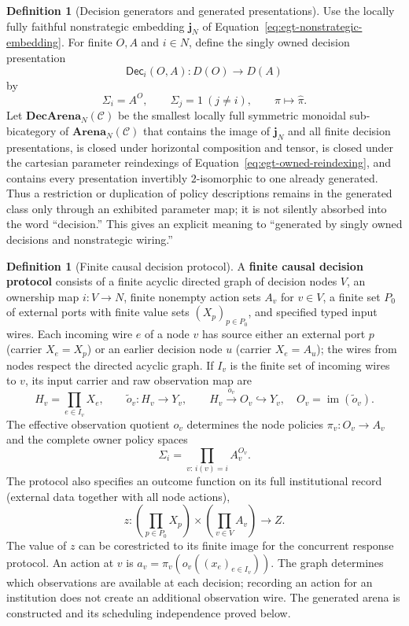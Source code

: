 \documentclass[11pt,a4paper]{article}
\numberwithin{equation}{section}
\theoremstyle{definition}
\newtheorem{definition}[theorem]{Definition}
\theoremstyle{remark}
\theoremstyle{plain}
\begin{document}
\begin{definition}[Decision generators and generated presentations]
\label{def:egt-decision-generators-and-generated-presentations}
Use the locally fully faithful
nonstrategic embedding $\mathbf j_N$ of
Equation~\eqref{eq:egt-nonstrategic-embedding}. For finite $O,A$ and $i\in N$,
define the singly owned decision presentation
\[
 \mathsf{Dec}_i(O,A):D(O)\longrightarrow D(A)
\]
by
\[
 \Sigma_i=A^O,\qquad \Sigma_j=1\ (j\ne i),\qquad
 \pi\longmapsto\widehat\pi.
\]
Let $\mathbf{DecArena}_N(\mathcal C)$ be the smallest locally full symmetric
monoidal sub-bicategory of $\mathbf{Arena}_N(\mathcal C)$ that contains the
image of $\mathbf j_N$ and all finite decision presentations, is closed under
horizontal composition and tensor, is closed under the cartesian parameter
reindexings of Equation~\eqref{eq:egt-owned-reindexing}, and contains every
presentation invertibly $2$-isomorphic to one already generated. Thus a
restriction or duplication of policy descriptions remains in the generated
class only through an exhibited parameter map; it is not silently absorbed
into the word ``decision.'' This gives an explicit meaning to ``generated by
singly owned decisions and nonstrategic wiring.''
\end{definition}

\begin{definition}[Finite causal decision protocol]
\label{def:egt-finite-causal-decision-protocol}
A \textbf{finite causal decision protocol} consists of a finite acyclic
directed graph of decision nodes $V$, an ownership map $i:V\to N$,
finite nonempty action sets $A_v$ for $v\in V$, a finite set $P_0$
of external ports with finite value sets $(X_p)_{p\in P_0}$, and
specified typed input wires. Each incoming wire $e$ of a node $v$
has source either an external port $p$ (carrier $X_e=X_p$) or an
earlier decision node $u$ (carrier $X_e=A_u$); the wires from nodes
respect the directed acyclic graph. If $I_v$ is the finite set of
incoming wires to $v$, its input carrier and raw observation map are
\[
 H_v=\prod_{e\in I_v}X_e,\qquad
 \widetilde o_v:H_v\to Y_v,\qquad
 H_v\xrightarrow{o_v}O_v\hookrightarrow Y_v,
 \quad O_v=\operatorname{im}(\widetilde o_v).
\]
The effective observation quotient $o_v$ determines the node policies
$\pi_v:O_v\to A_v$ and the complete owner policy spaces
\[
 \Sigma_i=\prod_{v:\,i(v)=i}A_v^{O_v}.
\]
The protocol also specifies an outcome function on its full institutional
record (external data together with all node actions),
\[
 z:\left(\prod_{p\in P_0}X_p\right)\times
    \left(\prod_{v\in V}A_v\right)\longrightarrow Z.
\]
The value of $z$ can be corestricted to its finite image for the
concurrent response protocol. An action at $v$ is
$a_v=\pi_v(o_v((x_e)_{e\in I_v}))$. The graph determines which
observations are available at each decision; recording an action for
an institution does not create an additional observation wire.
The generated arena is constructed and its scheduling independence
proved below.
\end{definition}
\end{document}

